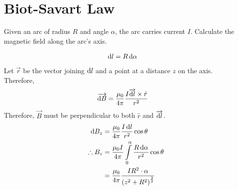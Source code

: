 \documentclass[fleqn, a4paper, 12pt, twoside]{article}
\theoremstyle{definition}
\theoremstyle{theorem}
\begin{document}
\addtocounter{question}{1}

\section{Biot-Savart Law}

\begin{question}
	Given an arc of radius $R$ and angle $\alpha$, the arc carries current $I$.
	Calculate the magnetic field along the arc's axis.
\end{question}

\begin{solution}
	\begin{align*}
		\dif l &= R \dif \alpha
	\end{align*}
	Let $\overrightarrow{r}$ be the vector joining $\dif l$ and a point at a distance $z$ on the axis.\\
	Therefore,
	\begin{align*}
		\overrightarrow{\dif B} &= \frac{\mu_0}{4 \pi} \frac{I \overrightarrow{\dif l} \times \hat{r}}{r^2}
	\end{align*}
	Therefore, $\overrightarrow{B}$ must be perpendicular to both $\hat{r}$ and $\overrightarrow{\dif l}$.
	\begin{align*}
		\dif B_z &= \frac{\mu_0}{4 \pi} \frac{I \dif l}{r^2} \cos \theta\\
		\therefore B_z &= \frac{\mu_0 I}{4 \pi} \int\limits_{0}^{\alpha} \frac{R \dif \alpha}{r^2} \cos \theta\\
		&= \frac{\mu_0}{4 \pi} \frac{I R^2 \cdot \alpha}{\left( z^2 + R^2 \right)^{\frac{3}{2}}}
	\end{align*}
\end{solution}
\end{document}
